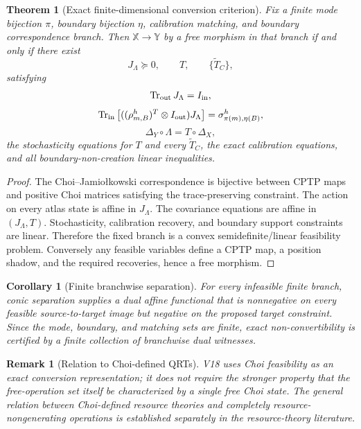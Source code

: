 \documentclass[11pt]{article}
\newtheorem{theorem}{Theorem}
\newtheorem{corollary}{Corollary}
\newtheorem{remark}{Remark}
\newcommand{\Tr}{\operatorname{Tr}}
\begin{document}
\begin{theorem}[Exact finite-dimensional conversion criterion]
Fix a finite mode bijection \(\pi\), boundary bijection \(\eta\), calibration matching, and boundary correspondence branch. Then \(\mathbb X\to\mathbb Y\) by a free morphism in that branch if and only if there exist
\[
J_\Lambda\succeq0,
\qquad
T,
\qquad
\{\widetilde T_C\},
\]
satisfying
\[
\Tr_{\rm out}J_\Lambda=I_{\rm in},
\]
\[
\Tr_{\rm in}\left[( (\rho_{m,B}^{h})^T\otimes I_{\rm out})J_\Lambda\right]
=
\sigma_{\pi(m),\eta(B)}^h,
\]
\[
\Delta_Y\circ\Lambda=T\circ\Delta_X,
\]
the stochasticity equations for \(T\) and every \(\widetilde T_C\), the exact calibration equations, and all boundary-non-creation linear inequalities.
\end{theorem}

\begin{proof}
The Choi--Jamio\l{}kowski correspondence is bijective between CPTP maps and positive Choi matrices satisfying the trace-preserving constraint. The action on every atlas state is affine in \(J_\Lambda\). The covariance equations are affine in \((J_\Lambda,T)\). Stochasticity, calibration recovery, and boundary support constraints are linear. Therefore the fixed branch is a convex semidefinite/linear feasibility problem. Conversely any feasible variables define a CPTP map, a position shadow, and the required recoveries, hence a free morphism.
\end{proof}

\begin{corollary}[Finite branchwise separation]
For every infeasible finite branch, conic separation supplies a dual affine functional that is nonnegative on every feasible source-to-target image but negative on the proposed target constraint. Since the mode, boundary, and matching sets are finite, exact non-convertibility is certified by a finite collection of branchwise dual witnesses.
\end{corollary}

\begin{remark}[Relation to Choi-defined QRTs]
V18 uses Choi feasibility as an exact conversion representation; it does not require the stronger property that the free-operation set itself be characterized by a single free Choi state. The general relation between Choi-defined resource theories and completely resource-nongenerating operations is established separately in the resource-theory literature. \cite{ChoiQRT}
\end{remark}
\end{document}

